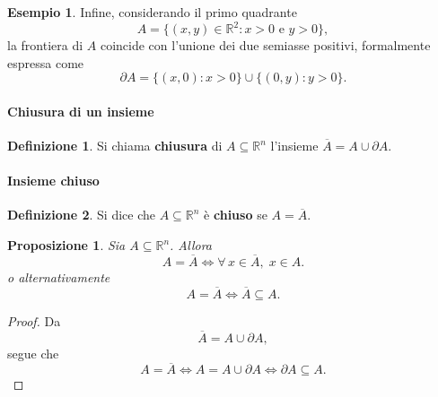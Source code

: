 \documentclass{article}
\theoremstyle{plain}
\newtheorem{prop}[thm]{Proposizione}
\theoremstyle{definition}
\newtheorem{defn}{Definizione}[section]
\newtheorem{exmp}{Esempio}[section]
\theoremstyle{remark}
\begin{document}
\vspace{10pt}

\begin{exmp}
    Infine, considerando il primo quadrante
    \[
    A = \{(x,y) \in \mathbb{R}^2 : x>0 \text{ e } y>0\},
    \]
    la frontiera di \( A \) coincide con l'unione dei due semiasse positivi, formalmente espressa come
    \[
    \partial A = \{(x,0) : x > 0\} \cup \{(0,y) : y > 0\}.
    \]
\end{exmp}

\vspace{10pt}

\paragraph{Chiusura di un insieme}
\begin{bxthm}
\begin{defn}
    Si chiama \textbf{chiusura} di $A\subseteq\mathbb{R}^n$ l'insieme $\overline{A}=A\cup\partial A$. 
\end{defn}
\end{bxthm}

\vspace{10pt}

\paragraph{Insieme chiuso}
\begin{bxthm}
\begin{defn}
    Si dice che $A\subseteq\mathbb{R}^n$ è \textbf{chiuso} se $A=\overline{A}$.
\end{defn}
\end{bxthm}

\vspace{10pt}

\begin{bxthm}
\begin{prop}
    Sia $A\subseteq\mathbb{R}^n$.
    Allora 
    \[A=\overline{A}\iff\forall\,x\in\overline{A},\;x\in A.\]
    o alternativamente
    \[A=\overline{A}\iff\overline{A}\subseteq A.\]
\end{prop}
\end{bxthm}
\begin{proof}
    Da
    \[\overline{A}=A\cup\partial A,\]
    segue che 
    \[A=\overline{A}\iff A=A\cup \partial A \iff\partial A\subseteq A.\]
\end{proof}

\vspace{10pt}
\end{document}
